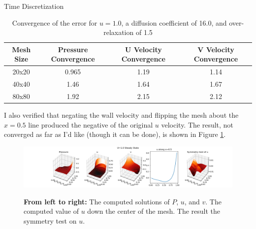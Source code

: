 \documentclass{article}
\begin{document}
\begin{section}{Time Discretization}
\begin{table}[ht]
  \begin{tabular}{|c|c|c|c|}
    \hline
    Mesh Size & Pressure Convergence & U Velocity Convergence & V Velocity Convergence\\
    \hline
    20x20 & 0.965 & 1.19 & 1.14\\
    40x40 & 1.46 & 1.64 & 1.67\\
    80x80 & 1.92 & 2.15 & 2.12\\
    \hline
  \end{tabular}
  \label{mesh_convergence}
  \caption{Convergence of the error for $u=1.0$, a diffusion coefficient of 16.0,
    and over-relaxation of 1.5}
\end{table}

I also verified that negating the wall velocity and flipping the mesh about the $x=0.5$ line
produced the negative of the original $u$ velocity.
The result, not converged as far as I'd like (though it can be done), is shown in Figure \ref{u_sym}.

\begin{figure}[ht]
  \hspace{-30mm}
  \includegraphics[width=1.35\textwidth]{mesh_convergence_u_sym/symmetry.png}
  \label{u_sym}
  \caption{{\bf From left to right:} The computed solutions of $P$, $u$, and $v$.
    The computed value of $u$ down the center of the mesh.
    The result the symmetry test on $u$.
  }
\end{figure}

\end{section}
\end{document}
